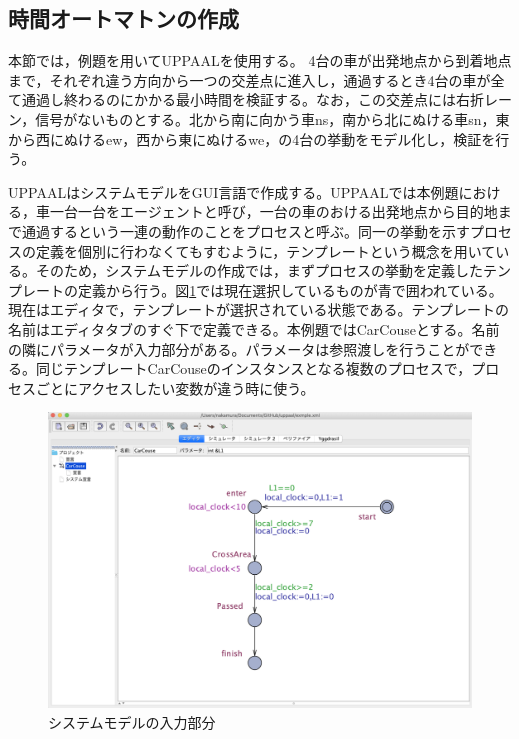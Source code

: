 \documentclass{tpu-sotu}
\begin{document}
	\subsection{時間オートマトンの作成}
	本節では，例題を用いてUPPAALを使用する。
	4台の車が出発地点から到着地点まで，それぞれ違う方向から一つの交差点に進入し，通過するとき4台の車が全て通過し終わるのにかかる最小時間を検証する。なお，この交差点には右折レーン，信号がないものとする。北から南に向かう車ns，南から北にぬける車sn，東から西にぬけるew，西から東にぬけるwe，の4台の挙動をモデル化し，検証を行う。
	
	UPPAALはシステムモデルをGUI言語で作成する。UPPAALでは本例題における，車一台一台をエージェントと呼び，一台の車のおける出発地点から目的地まで通過するという一連の動作のことをプロセスと呼ぶ。同一の挙動を示すプロセスの定義を個別に行わなくてもすむように，テンプレートという概念を用いている。そのため，システムモデルの作成では，まずプロセスの挙動を定義したテンプレートの定義から行う。図\ref{CC}では現在選択しているものが青で囲われている。現在はエディタで，テンプレートが選択されている状態である。テンプレートの名前はエディタタブのすぐ下で定義できる。本例題ではCarCouseとする。名前の隣にパラメータが入力部分がある。パラメータは参照渡しを行うことができる。同じテンプレートCarCouseのインスタンスとなる複数のプロセスで，プロセスごとにアクセスしたい変数が違う時に使う。
	\begin{figure}[htbp]
	\centering
	\includegraphics[width=145mm]{CarCouse.png}
	\caption{システムモデルの入力部分}
	\label{CC}
	\end{figure}
	
\end{document}
